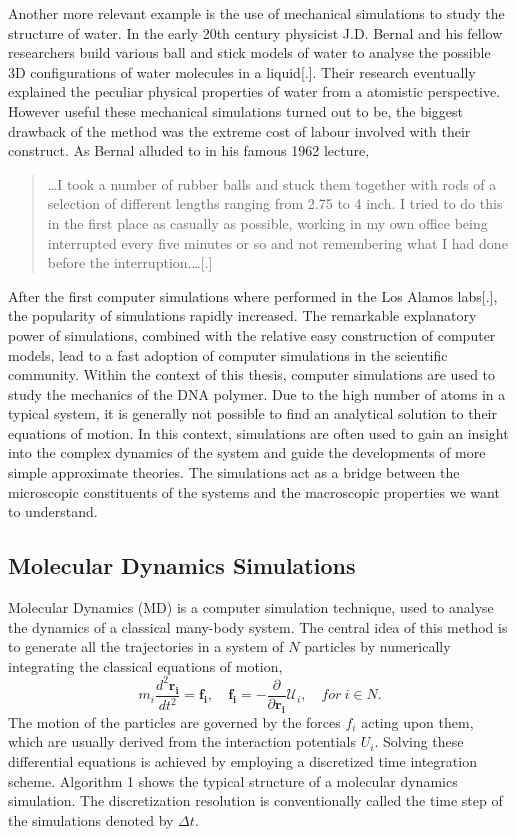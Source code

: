 Another more relevant example is the use of mechanical simulations to study the
structure of water.  In the early 20th century physicist J.D. Bernal and his fellow
researchers build various ball and stick models of water to analyse the possible 3D
configurations of water molecules in a liquid[.]. Their research eventually explained the
peculiar physical properties of water from a atomistic perspective. However useful these
mechanical simulations turned out to be, the biggest drawback of the method was the
extreme cost of labour involved with their construct. As Bernal alluded to in his
famous 1962 lecture,

\begin{quote}
\dots I took a number of rubber balls and stuck them together with rods of a
selection of different lengths ranging from 2.75 to 4 inch. I tried to do this in the
first place as casually as possible, working in my own office being interrupted every
five minutes or so and not remembering what I had done before the interruption.\dots[.]
\end{quote}

After the first computer simulations where performed in the Los Alamos labs[.], the
popularity of simulations rapidly increased. The remarkable explanatory power of
simulations, combined with the relative easy construction of computer models, lead to a
fast adoption of computer simulations in the scientific community. Within the context of
this thesis, computer simulations are used to study the mechanics of
the DNA polymer. Due to the high number of atoms in a typical system, it is generally
not possible to find an analytical solution to their equations of motion. In this
context, simulations are often used to gain an insight into the complex dynamics of the
system and guide the developments of more simple approximate theories. The simulations
act as a bridge between the microscopic constituents of the systems and the macroscopic
properties we want to understand.

\subsection{Molecular Dynamics Simulations}
Molecular Dynamics (MD) is a computer simulation technique, used to analyse
the dynamics of a classical many-body system. The central idea of this method is to
generate all the trajectories in a system of $N$ particles by numerically
integrating the classical equations of motion,
\[
m_i \frac{d^2 \boldsymbol{r_i}}{dt^2} = \boldsymbol{f_i}, \quad \boldsymbol{f_i} = -
    \frac{\partial}{\partial \boldsymbol{r_i}} \mathcal{U}_i, \quad for\ i \in N.
\]
The motion of the particles are governed by the forces $f_i$ acting upon them, which are
usually derived from the interaction potentials $U_i$.
Solving these differential equations is achieved by employing a discretized time
integration scheme.  Algorithm 1 shows the typical structure of a molecular dynamics
simulation. The discretization resolution is conventionally called the time step of the
simulations denoted by $\Delta t$.\\


